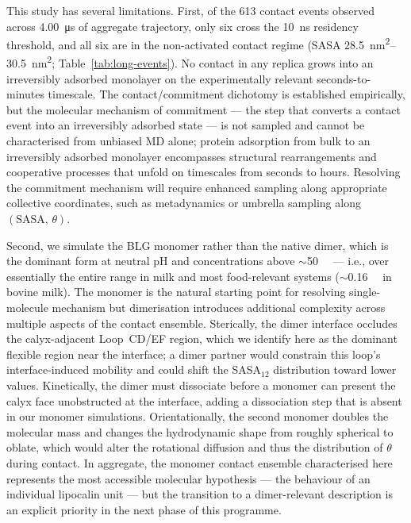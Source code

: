 \documentclass[11pt,a4paper]{article}
\begin{document}
This study has several limitations. First, of the \num{613} contact
events observed across \SI{4.00}{\micro\second} of aggregate trajectory,
only six cross the \SI{10}{\nano\second} residency threshold, and all
six are in the non-activated contact regime (SASA
\SIrange{28.5}{30.5}{\nano\metre\squared}; Table~\ref{tab:long-events}).
No contact in any replica grows into an irreversibly adsorbed monolayer
on the experimentally relevant seconds-to-minutes
timescale\citep{Cornec1999,Ulaganathan2017a}. The contact/commitment
dichotomy is established empirically, but the molecular mechanism of
commitment --- the step that converts a contact event into an irreversibly
adsorbed state --- is not sampled and cannot be characterised from
unbiased MD alone; protein adsorption from bulk to an irreversibly
adsorbed monolayer encompasses structural rearrangements and cooperative
processes that unfold on timescales from seconds to hours\citep{Rabe2011}.
Resolving the commitment mechanism will require enhanced sampling along
appropriate collective coordinates, such as metadynamics or umbrella
sampling along $(\mathrm{SASA},\,\theta)$.

Second, we simulate the BLG monomer rather than the native dimer, which
is the dominant form at neutral pH and concentrations above
$\sim$\SI{50}{\micro\Molar}\citep{Mercadante2012} --- i.e., over
essentially the entire range in milk and most food-relevant systems
($\sim$\SI{0.16}{\milli\Molar} in bovine milk). The monomer is the
natural starting point for resolving single-molecule mechanism but
dimerisation introduces additional complexity across multiple aspects of
the contact ensemble. Sterically, the dimer interface occludes the
calyx-adjacent Loop~CD/EF region, which we identify here as the dominant
flexible region near the interface; a dimer partner would constrain this
loop's interface-induced mobility and could shift the SASA$_{12}$
distribution toward lower values. Kinetically, the dimer must dissociate
before a monomer can present the calyx face unobstructed at the interface,
adding a dissociation step that is absent in our monomer simulations.
Orientationally, the second monomer doubles the molecular mass and
changes the hydrodynamic shape from roughly spherical to oblate, which
would alter the rotational diffusion and thus the distribution of $\theta$
during contact. In aggregate, the monomer contact ensemble characterised
here represents the most accessible molecular hypothesis --- the behaviour
of an individual lipocalin unit --- but the transition to a dimer-relevant
description is an explicit priority in the next phase of this programme.
\end{document}
